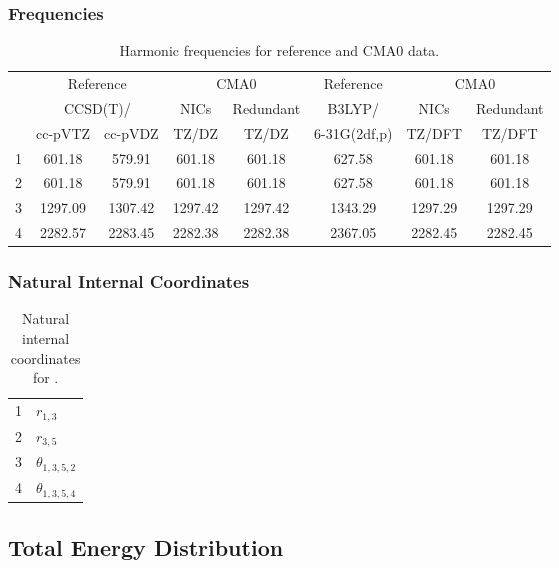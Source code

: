\documentclass[10pt,oneside]{article}
\begin{document}
\begin{table}[h!]
\subsubsection*{Frequencies}
\centering
\caption{Harmonic frequencies for reference and CMA0 data.}
\begin{tabular}{cccccccc}
\toprule
{} & \multicolumn{2}{c}{Reference} & \multicolumn{2}{c}{CMA0} &    Reference & \multicolumn{2}{c}{CMA0} \\
{} & \multicolumn{2}{c}{CCSD(T)/} &    NICs &  Redundant &       B3LYP/ &    NICs & Redundant \\
{} &   cc-pVTZ & cc-pVDZ &   TZ/DZ &      TZ/DZ & 6-31G(2df,p) &  TZ/DFT &    TZ/DFT \\
\midrule
1 &    601.18 &  579.91 &  601.18 &     601.18 &       627.58 &  601.18 &    601.18 \\
2 &    601.18 &  579.91 &  601.18 &     601.18 &       627.58 &  601.18 &    601.18 \\
3 &   1297.09 & 1307.42 & 1297.42 &    1297.42 &      1343.29 & 1297.29 &   1297.29 \\
4 &   2282.57 & 2283.45 & 2282.38 &    2282.38 &      2367.05 & 2282.45 &   2282.45 \\
\bottomrule
\end{tabular}
\end{table}

\begin{table}[h!]
\subsubsection*{Natural Internal Coordinates}
\centering
\caption{Natural internal coordinates for .}
\small
\begin{tabular}{ll}
\toprule
  1   & $r_{1,3}$ \\
  2   & $r_{3,5}$ \\
  3   & $\theta_{1,3,5,2}$ \\
  4   & $\theta_{1,3,5,4}$ \\
\bottomrule
\end{tabular}
\end{table}

\begin{table}
\subsection*{Total Energy Distribution}
\centering\end{table}
\end{document}
